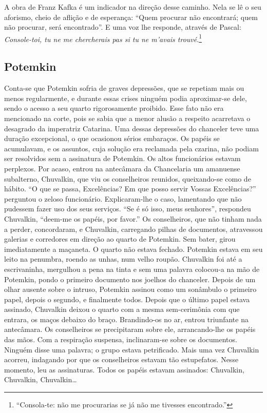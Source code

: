 A obra de Franz Kafka é um indicador
na direção desse caminho. Nela se lê o
seu aforismo, cheio de aflição e de esperança: ``Quem procurar não
encontrará; quem não procurar, será encontrado''. E uma voz lhe responde, através de Pascal:
\textit{Console-toi, tu ne me chercherais pas si tu ne m'avais trouvé}.\footnote{``Consola-te: não me procurarias se já não me tivesses encontrado.''}




\subsection{Potemkin}

Conta-se que Potemkin sofria de graves depressões, que se repetiam mais
ou menos regularmente, e durante essas crises ninguém podia aproximar-se
dele, sendo o acesso a seu quarto rigorosamente proibido. Esse fato não
era mencionado na corte, pois se sabia que a menor alusão a respeito
acarretava o desagrado da imperatriz Catarina. Uma dessas depressões do
chanceler teve uma duração excepcional, o que ocasionou sérios
embaraços. Os papéis se acumulavam, e os assuntos, cuja solução era
reclamada pela czarina, não podiam ser resolvidos sem a assinatura de
Potemkin. Os altos funcionários estavam perplexos. Por acaso, entrou na
antecâmara da Chancelaria um amanuense subalterno, Chuvalkin, que viu os
conselheiros reunidos, queixando-se como de hábito. ``O que se passa,
Excelências? Em que posso servir Vossas Excelências?'' perguntou o
zeloso funcionário. Explicaram-lhe o caso, lamentando que não pudessem
fazer uso dos seus serviços. ``Se é só isso, meus senhores'', respondeu
Chuvalkin, ``deem-me os papéis, por favor.'' Os conselheiros, que não
tinham nada a perder, concordaram, e Chuvalkin, carregando pilhas de
documentos, atravessou galerias e corredores em direção ao quarto de
Potemkin. Sem bater, girou imediatamente a maçaneta. O quarto não estava
fechado. Potemkin estava em seu leito na penumbra, roendo as unhas, num
velho roupão. Chuvalkin foi até a escrivaninha, mergulhou a pena na
tinta e sem uma palavra colocou-a na mão de Potemkin, pondo o primeiro
documento nos joelhos do chanceler. Depois de um olhar ausente sobre o
intruso, Potemkin assinou como um sonâmbulo o primeiro papel, depois o
segundo, e finalmente todos. Depois que o último papel estava assinado,
Chuvalkin deixou o quarto com a mesma sem-cerimônia com que entrara, os
maços debaixo do braço. Brandindo-os no ar, entrou triunfante na
antecâmara. Os conselheiros se precipitaram sobre ele, arrancando-lhe os
papéis das mãos. Com a respiração suspensa, inclinaram-se sobre os
documentos. Ninguém disse uma palavra; o grupo estava petrificado. Mais
uma vez Chuvalkin acorreu, indagando por que os conselheiros estavam tão
estupefatos. Nesse momento, leu as assinaturas. Todos os papéis estavam
assinados: Chuvalkin, Chuvalkin, Chuvalkin\ldots{}

